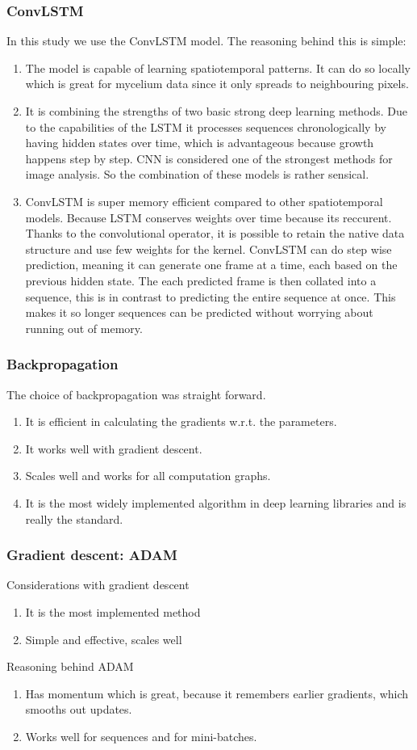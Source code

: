 \documentclass[a4paper,12pt]{article}
\begin{document}
\subsubsection{ConvLSTM}
In this study we use the ConvLSTM model. The reasoning behind this is simple:
\begin{enumerate}
  \item The model is capable of learning spatiotemporal patterns. It can do so locally which is great for mycelium data since it only spreads to neighbouring pixels. 
  \item It is combining the strengths of two basic strong deep learning methods. Due to the capabilities of the LSTM it processes sequences chronologically by having hidden states over time, which is advantageous because growth happens step by step. CNN is considered one of the strongest methods for image analysis. So the combination of these models is rather sensical.
  \item ConvLSTM is super memory efficient compared to other spatiotemporal models. Because LSTM conserves weights over time because its reccurent. Thanks to the convolutional operator, it is possible to retain the native data structure and use few weights for the kernel. ConvLSTM can do step wise prediction, meaning it can generate one frame at a time, each based on the previous hidden state. The each predicted frame is then collated into a sequence, this is in contrast to predicting the entire sequence at once. This makes it so longer sequences can be predicted without worrying about running out of memory.
\end{enumerate}
\subsubsection{Backpropagation}
The choice of backpropagation was straight forward.
\begin{enumerate}
  \item It is efficient in calculating the gradients w.r.t. the parameters.
  \item It works well with gradient descent.
  \item Scales well and works for all computation graphs.
  \item It is the most widely implemented algorithm in deep learning libraries and is really the standard.
\end{enumerate}
\subsubsection{Gradient descent: ADAM}
Considerations with gradient descent
\begin{enumerate}
  \item It is the most implemented method
  \item Simple and effective, scales well
\end{enumerate}
Reasoning behind ADAM
\begin{enumerate}
  \item Has momentum which is great, because it remembers earlier gradients, which smooths out updates.
  \item Works well for sequences and for mini-batches.
\end{enumerate}
\end{document}
